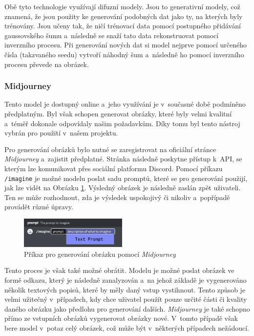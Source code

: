 Obě tyto technologie využívají difuzní modely. Jsou to generativní modely, což znamená, že jsou použity ke generování podobných dat jako ty, na kterých byly trénovány. Jsou učeny tak, že ničí trénovací data pomocí postupného přidávání gaussovského šumu a~následně se snaží tato data rekonstruovat pomocí inverzního procesu. Při generování nových dat si model nejprve pomocí určeného čísla (takzvaného seedu) vytvoří náhodný šum a~následně ho pomocí inverzního procesu převede na obrázek.

\subsubsection*{Midjourney}
Tento model je dostupný online a~jeho využívání je v~současné době podmíněno předplatným. Byl však schopen generovat obrázky, které byly velmi kvalitní a~téměř dokonale odpovídaly našim požadavkům. Díky tomu byl tento nástroj vybrán pro použití v~našem projektu.

Pro generování obrázků bylo nutné se zaregistrovat na oficiální stránce \textit{Midjourney} a~zajistit předplatné. Stránka následně poskytne přístup k~API, se kterým lze komunikovat přes sociální platformu Discord. Pomocí příkazu \texttt{/imagine} je možné modelu poslat sadu promptů, které se pro generování použijí, jak lze vidět na Obrázku \ref{fig:mj_prompts}. Výsledný obrázek je následně zaslán zpět uživateli. Ten se může rozhodnout, zda je výsledek uspokojivý či nikoliv a~popřípadě provádět různé úpravy.

\begin{figure}[H]
    \centering
    \includegraphics[width=0.475\textwidth]{resources/figures/midjourney_prompts.png}
    \caption{Příkaz pro generování obrázku pomocí \textit{Midjourney} \cite{midjourney}}
    \label{fig:mj_prompts}
\end{figure}

Tento proces je však také možné obrátit. Modelu je možné poslat obrázek ve formě odkazu, který je následně zanalyzován a~na jehož základě je vygenerováno několik textových popisů, které by měly daný vstup vystihnout. Tento způsob je velmi užitečný v~případech, kdy chce uživatel použít pouze určité části či kvality daného obrázku jako předlohu pro generování dalších. \textit{Midjourney} je také schopno přímo ze vstupních obrázků vygenerovat obrázky nové. V~tomto případě však bere model v~potaz celý obrázek, což může být v~některých případech nežádoucí.

